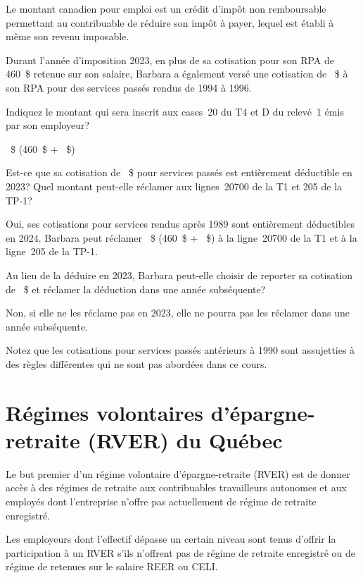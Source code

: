 Le montant canadien pour emploi est un crédit d'impôt non remboursable permettant au contribuable de réduire son impôt à payer, lequel est établi à même son revenu imposable.

\begin{question}
	Durant l'année d'imposition 2023, en plus de sa cotisation pour son RPA de 460~\$ retenue sur son salaire, Barbara a également versé une cotisation de ~\$ à son RPA pour des services passés rendus de 1994 à 1996.
\end{question}
\setcounter{sousQuestion}{0}
\begin{sousQuestion}
	Indiquez le montant qui sera inscrit aux cases~20 du T4 et D du relevé~1 émis par son employeur?
\end{sousQuestion}
~\$ (460~\$ + ~\$)
\begin{sousQuestion}
	Est-ce que sa cotisation de ~\$ pour services passés est entièrement déductible en 2023?  Quel montant peut-elle réclamer aux lignes~20700 de la T1 et 205 de la TP-1?
\end{sousQuestion}
Oui, ses cotisations pour services rendus après 1989 sont entièrement déductibles en 2024. Barbara peut réclamer ~\$ (460~\$ + ~\$) à la ligne~20700 de la T1 et à la ligne~205 de la TP-1.
\begin{sousQuestion}
	Au lieu de la déduire en 2023, Barbara peut-elle choisir de reporter sa cotisation de ~\$ et réclamer la déduction dans une année subséquente?
\end{sousQuestion}
Non, si elle ne les réclame pas en 2023, elle ne pourra pas les réclamer dans une année subséquente.

Notez que les cotisations pour services passés antérieurs à 1990 sont assujetties à des règles différentes qui ne sont pas abordées dans ce cours.



\section{Régimes volontaires d'épargne-retraite (RVER) du Québec}
\begin{intro}
	Le but premier d'un régime volontaire d'épargne-retraite (RVER) est de donner accès à des régimes de retraite aux contribuables travailleurs autonomes et aux employés dont l'entreprise n'offre pas actuellement de régime de retraite enregistré.
\end{intro}
Les employeurs dont l'effectif dépasse un certain niveau sont tenus d'offrir la participation à un RVER s'ils n'offrent pas de régime de retraite enregistré ou de régime de retenues sur le salaire REER ou CELI.


